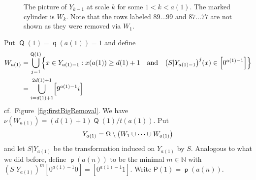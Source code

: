 \documentclass[AHL,Unicode,longabstracts,published]{cedram}
\DeclareMathOperator{\p}{\mathsf{p}}
\DeclareMathOperator{\q}{\mathsf{q}}
\DeclareMathOperator{\Q}{\mathsf{Q}}
\newcommand{\N}{\mathbb{N}}
\renewcommand{\P}{\mathsf{P}}
\let\originalleft\left
\let\originalright\right
\renewcommand{\left}{\mathopen{}\mathclose\bgroup\originalleft}
\renewcommand{\right}{\aftergroup\egroup\originalright}
\begin{document}
\begin{figure}[!h]

\caption{The picture of $Y_{k-1}$ at scale $k$ for some $1 < k < a(1)$. The marked cylinder is $W_k$. Note that the rows labeled $89 \dots 99$ and $87 \dots 77$ are not shown as they were removed via $W_1$.}\label{fig:boundedRemoval}
\end{figure}



Put $\Q(1) = \q(a(1)) = 1$ and define
\begin{align*}
W_{a(1)} &=
\bigcup_{j=1}^{\Q(1)}
\left\{ x \in Y_{a(1)-1} : x(a(1)) \ge d(1) + 1
\quad\text{and}\quad
\left(S|Y_{a(1)-1}\right)^j(x) \in \left[0^{a(1) -1}\right]\right\}\\
&= \bigcup_{i=d(1)+1}^{2d(1)+1} \left[9^{a(1)-1} i\right]
\end{align*}
cf.\ Figure~\ref{fig:firstBigRemoval}. We have $\nu(W_{a(1)}) = (d(1) + 1) \Q(1) /t(a(1))$. Put
\[
Y_{a(1)} = \Omega \setminus \left(W_1 \cup \dots \cup W_{a(1)}\right)
\]
and let $S|Y_{a(1)}$ be the transformation induced on $Y_{a(1)}$ by $S$. Analogous to what we did before, define $\p(a(n))$ to be the minimal $m \in \N$ with $(S|Y_{a(1)})^m [0^{a(1)-1}0] = [0^{a(1) - 1} 1]$. Write $\P(1) = \p(a(n))$.
\end{document}
